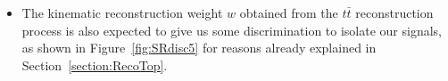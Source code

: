 \documentclass[a4paper, 10pt, openright]{report}
\begin{document}
\begin{itemize}
%

\item The kinematic reconstruction weight $w$ obtained from the $t \bar t$ reconstruction process is also expected to give us some discrimination to isolate our signals, as shown in Figure~\ref{fig:SRdisc5} for reasons already explained in Section~\ref{section:RecoTop}.


\end{itemize}
\end{document}
